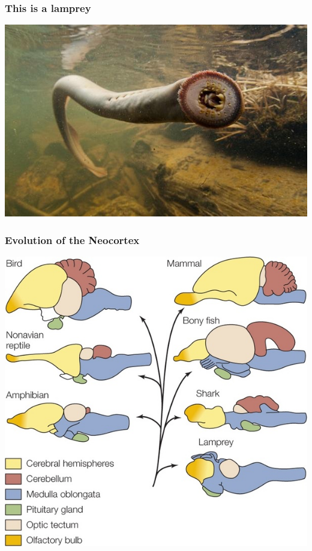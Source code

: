 \documentclass[16pt]{beamer}
\begin{document}
\begin{frame}
\frametitle{This is a lamprey}
	\includegraphics[scale=0.65]{lamprey.jpg}
\end{frame}

\begin{frame}
\frametitle{Evolution of the Neocortex}
\centering
\includegraphics[scale=0.4]{lamprey-to-neocortex.jpg}
\end{frame}
\end{document}
